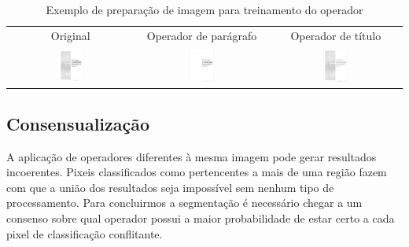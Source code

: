 \documentclass[a4paper,11pt]{article}
\begin{document}
      \begin{table}[hbt]
        \caption{Exemplo de preparação de imagem para treinamento do operador}
        \begin{center}
          \begin{tabular}{c c c}
            Original & Operador de parágrafo & Operador de título \\
            \includegraphics[width=0.2\textwidth]{assets/exemplo_aplicacao/695_black_and_white.png}
            &
            \includegraphics[width=0.2\textwidth]{assets/exemplo_aplicacao/695_paragraph.png}
            &
            \includegraphics[width=0.2\textwidth]{assets/exemplo_aplicacao/695_heading.png}
          \end{tabular}
        \end{center}
        \label{tab:aplicacao}
      \end{table}

    \subsection{Consensualização}

      A aplicação de operadores diferentes à mesma imagem pode gerar resultados incoerentes. Pixeis classificados como pertencentes a mais de uma região fazem com que a união dos resultados seja impossível sem nenhum tipo de processamento. Para concluirmos a segmentação é necessário chegar a um consenso sobre qual operador possui a maior probabilidade de estar certo a cada pixel de classificação conflitante.
\end{document}

